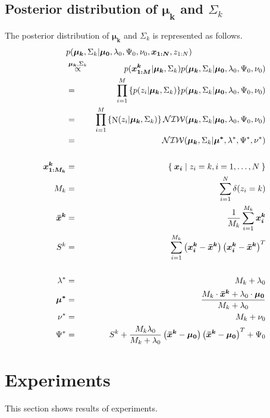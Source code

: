 \documentclass[a4paper]{article}
\DeclareMathOperator{\N}{\rm N}
\DeclareMathOperator{\NIW}{\mathcal{NIW}}
\newcommand{\proptoas}[1]{\overset{#1}{\propto}}
\begin{document}
	\subsection{Posterior distribution of $\boldsymbol{\mu_k}$ and $\Sigma_k$}
	The posterior distribution of $\boldsymbol{\mu_k}$ and $\Sigma_k$ is represented as follows.
	\begin{eqnarray}
		\lefteqn{
			p(\boldsymbol{\mu_k}, \Sigma_k | \boldsymbol{\mu_0}, \lambda_0, \Psi_0, \nu_0, \boldsymbol{x_{1:N}}, z_{1:N})
		}\nonumber \\
		&\proptoas{\boldsymbol{\mu_k}, \Sigma_k}&
		p(\boldsymbol{x^{k}_{1:M}} | \boldsymbol{\mu_k}, \Sigma_k) p(\boldsymbol{\mu_k}, \Sigma_k | \boldsymbol{\mu_0}, \lambda_0, \Psi_0, \nu_0)\\
		&=&
		\prod_{i=1}^{M}{\left\{ p(z_i | \boldsymbol{\mu_k}, \Sigma_k) \right\}} p(\boldsymbol{\mu_k}, \Sigma_k | \boldsymbol{\mu_0}, \lambda_0, \Psi_0, \nu_0) \\
		&=&
		\prod_{i=1}^{M}{\left\{ \N(z_i | \boldsymbol{\mu_k}, \Sigma_k) \right\}} \NIW(\boldsymbol{\mu_k}, \Sigma_k | \boldsymbol{\mu_0}, \lambda_0, \Psi_0, \nu_0) \\
		&=&
		\NIW(\boldsymbol{\mu_k}, \Sigma_k | \boldsymbol{\mu^*}, \lambda^*, \Psi^*, \nu^*) \\
		\nonumber \\
		\boldsymbol{x^{k}_{1:M_k}}
		&=&
		\Set{ \boldsymbol{x_i} | z_i = k, i=1, \ldots, N }\\
		M_k &=& \sum_{i=1}^{N}{\delta(z_i = k)} \\
		\boldsymbol{\bar{x}^k} &=& \frac{1}{M_k} \sum_{i=1}^{M_k}{\boldsymbol{x_i^k}} \\
		S^k
		&=&
		\sum_{i=1}^{M_k}{\left( \boldsymbol{x_i^k} - \boldsymbol{\bar{x}^k} \right) \left( \boldsymbol{x_i^k} - \boldsymbol{\bar{x}^k} \right)^T} \\
		\nonumber \\
		\lambda^* &=& M_k + \lambda_0 \\
		\boldsymbol{\mu^*}
		&=&
		\frac{M_k \cdot \boldsymbol{\bar{x}^k} + \lambda_0 \cdot \boldsymbol{\mu_0}}{M_k + \lambda_0}\\
		\nu^* &=& M_k + \nu_0\\
		\Psi^*
		&=&
		S^k + \frac{M_k \lambda_0}{M_k + \lambda_0} \left( \boldsymbol{\bar{x}^k} - \boldsymbol{\mu_0} \right) \left( \boldsymbol{\bar{x}^k} - \boldsymbol{\mu_0} \right)^T + \Psi_0
	\end{eqnarray}

	\section{Experiments}
	This section shows results of experiments.
\end{document}
